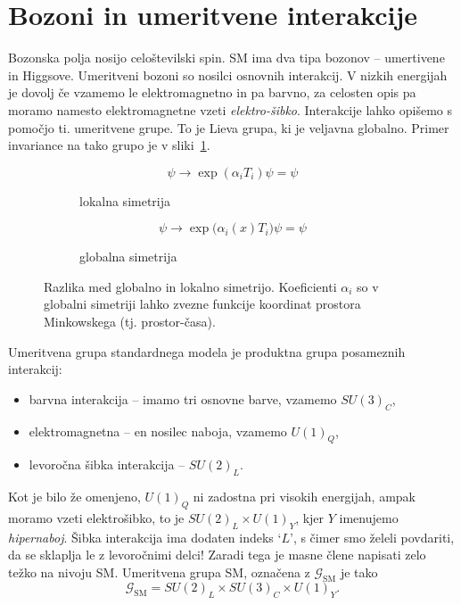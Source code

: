 \section{Bozoni in umeritvene interakcije}

Bozonska polja nosijo celoštevilski spin. SM ima dva tipa bozonov -- umertivene in Higgsove. Umeritveni
bozoni so nosilci osnovnih interakcij. V nizkih energijah je dovolj če vzamemo le elektromagnetno in
pa barvno, za celosten opis pa moramo namesto elektromagnetne vzeti \emph{elektro-šibko}. Interakcije
lahko opišemo s pomočjo ti. umeritvene grupe. To je Lieva grupa, ki je veljavna globalno. Primer
invariance na tako grupo je v sliki~\ref{Umeritvena}.
\begin{figure}[H]\centering
	\begin{subfigure}{0.45\textwidth}\centering
	\[
		\psi \to \exp (\alpha_i T_i) \psi = \psi
	\]
	\caption{lokalna simetrija}
	\end{subfigure}
	\begin{subfigure}{0.45\textwidth}\centering
	\[
		\psi \to \exp \big(\alpha_i(x) T_i\big) \psi = \psi
	\]
	\caption{globalna simetrija}
	\end{subfigure}
	\caption{Razlika med globalno in lokalno simetrijo. Koeficienti $\alpha_i$ so v globalni
		simetriji lahko zvezne funkcije koordinat prostora Minkowskega (tj. prostor-časa).}
	\label{Umeritvena}
\end{figure}
\noindent Umeritvena grupa standardnega modela je produktna grupa posameznih interakcij:
\begin{itemize}
	\item{barvna interakcija -- imamo tri osnovne barve, vzamemo $SU(3)_C$,}
	\item{elektromagnetna -- en nosilec naboja, vzamemo $U(1)_Q$,}
	\item{levoročna šibka interakcija -- $SU(2)_L$.}
\end{itemize}
Kot je bilo že omenjeno, $U(1)_Q$ ni zadostna pri visokih energijah, ampak moramo vzeti
elektrošibko, to je $SU(2)_L\times U(1)_Y$, kjer $Y$ imenujemo \emph{hipernaboj}. Šibka interakcija ima
dodaten indeks `$L$', s čimer smo želeli povdariti, da se sklaplja le z levoročnimi delci! Zaradi tega
je masne člene napisati zelo težko na nivoju SM. Umeritvena
grupa SM, označena z $\mathcal{G}_\text{SM}$ je tako
\begin{equation}
	\mathcal{G}_\text{SM} = SU(2)_L \times SU(3)_C \times U(1)_Y.
\end{equation}

